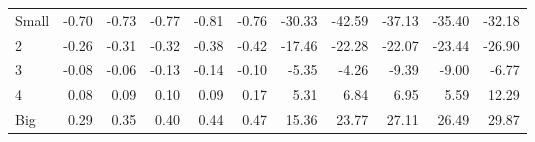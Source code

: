 \begin{table}[!ht]
\begin{tabular}{lrrrrrrrrrr}
    \\
      \cmidrule(r){2-6} \cmidrule(r){7-11}

    Small   & -0.70  & -0.73  & -0.77  & -0.81  & -0.76  & -30.33  & -42.59  & -37.13  & -35.40  & -32.18  \\
         2  & -0.26  & -0.31  & -0.32  & -0.38  & -0.42  & -17.46  & -22.28  & -22.07  & -23.44  & -26.90  \\
         3  & -0.08  & -0.06  & -0.13  & -0.14  & -0.10  & -5.35  & -4.26  & -9.39  & -9.00  & -6.77  \\
         4  & 0.08  & 0.09  & 0.10  & 0.09  & 0.17  & 5.31  & 6.84  & 6.95  & 5.59  & 12.29  \\
    Big     & 0.29  & 0.35  & 0.40  & 0.44  & 0.47  & 15.36  & 23.77  & 27.11  & 26.49  & 29.87  \\

  

  \bottomrule
\end{tabular}
\label{tbl:25_Size_Prior_C1997}
\end{table}